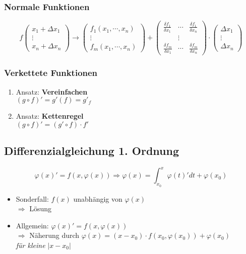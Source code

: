 \subsubsection{Normale Funktionen}
\begin{displaymath}
	f
	\begin{pmatrix}
		x_1 + \Delta x_1 \\
		\vdots \\
		x_n + \Delta x_n
	\end{pmatrix}
	\rightarrow
	\begin{pmatrix}
		f_1(x_1,\cdots , x_n) \\
		\vdots \\
		f_m(x_1,\cdots , x_n)
	\end{pmatrix}
	+
	\begin{pmatrix}
		\frac{\delta f_1}{\delta x_1} & \cdots & \frac{\delta f_1}{\delta x_n} \\
		& \vdots & \\
		\frac{\delta f_m}{\delta x_1} & \cdots & \frac{\delta f_m}{\delta x_n}
	\end{pmatrix}
	\cdot
	\begin{pmatrix}
		\Delta x_1 \\
		\vdots \\
		\Delta x_n
	\end{pmatrix}
\end{displaymath}

\subsubsection{Verkettete Funktionen}
\begin{enumerate}
    \item Ansatz: \textbf{Vereinfachen} \\
    $(g \circ f)' = g'(f) = g'_f$

    \item Ansatz: \textbf{Kettenregel} \\
    $(g \circ f)' = (g' \circ f) \cdot f'$
\end{enumerate}

\subsection{Differenzialgleichung 1. Ordnung}
\begin{equation}
    \varphi(x)' = f(x, \varphi(x)) \Rightarrow \varphi(x) = \int_{x_0}^x \varphi(t)' dt + \varphi(x_0)
\end{equation}
\begin{itemize}
    \item Sonderfall: $f(x)$ unabhängig von  $\varphi(x)$ \\
    $\Rightarrow$ Lösung

    \item Allgemein: $\varphi(x)' = f(x, \varphi(x))$ \\
    $\Rightarrow$ Näherung durch $\varphi(x) = (x - x_0) \cdot f(x_0, \varphi(x_0)) + \varphi(x_0)$ \\
    \textit{für kleine} $|x - x_0|$
\end{itemize}

